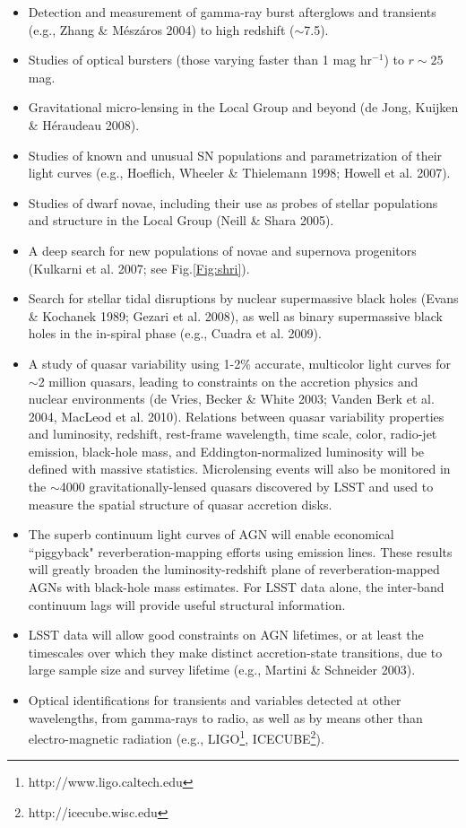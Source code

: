 \documentclass{emulateapj}
\newcommand{\B}[1]{{#1}}
\begin{document}
\begin{itemize}
\item Detection and measurement of gamma-ray burst afterglows and transients 
      (e.g., Zhang \& M\'{e}sz\'{a}ros 2004) to high redshift ($\sim$7.5).
\item Studies of optical bursters (those varying faster than 1 mag hr$^{-1}$) to $r\sim25$ mag. 
\item Gravitational micro-lensing in the Local Group and beyond (de Jong, Kuijken \& H\'{e}raudeau 2008).
\item Studies of known and unusual SN populations and parametrization of their light curves 
         (e.g., Hoeflich, Wheeler \& Thielemann 1998; Howell et al. 2007).
\item Studies of dwarf novae, including their use as probes of stellar populations and 
      structure in the Local Group (Neill \& Shara 2005).
\item A deep search for new populations of novae and supernova progenitors 
      (Kulkarni et al. 2007; see Fig.\ref{Fig:shri}). 
\item Search for stellar tidal disruptions by nuclear supermassive black
       holes (Evans \& Kochanek 1989; Gezari et al. 2008), \B{as well as binary supermassive black holes 
      in the in-spiral phase (e.g., Cuadra et al. 2009).}
\item A study of quasar variability using 1-2\% accurate, multicolor light
      curves for $\sim$2 million quasars, leading to constraints on the accretion physics
      and nuclear environments (de Vries, Becker \& White 2003; Vanden Berk et al. 2004, MacLeod 
      et al. 2010). Relations between quasar variability properties and luminosity, redshift, 
      rest-frame wavelength, time scale, color, radio-jet emission, black-hole 
      mass, and Eddington-normalized luminosity will be defined with massive
      statistics. Microlensing events will also be monitored in the $\sim$4000 gravitationally-lensed 
      quasars discovered by LSST and used to measure the spatial structure of quasar accretion disks.
\item The superb continuum light curves of AGN will enable economical ``piggyback" 
      reverberation-mapping efforts using emission lines. These results 
      will greatly broaden the luminosity-redshift plane of reverberation-mapped AGNs
      with black-hole mass estimates. For LSST data alone, the inter-band continuum lags 
      will provide useful structural information. 
\item LSST data will allow good constraints on AGN lifetimes, or at least the timescales over which 
         they make distinct accretion-state transitions, due to large sample
         size and survey lifetime (e.g., Martini \& Schneider 2003).
\item Optical identifications for transients and variables detected at other wavelengths,
      from gamma-rays to radio, as well as by means other than electro-magnetic
      radiation (e.g., LIGO\footnote{http://www.ligo.caltech.edu}, 
      ICECUBE\footnote{http://icecube.wisc.edu}).
\end{itemize}
\end{document}
